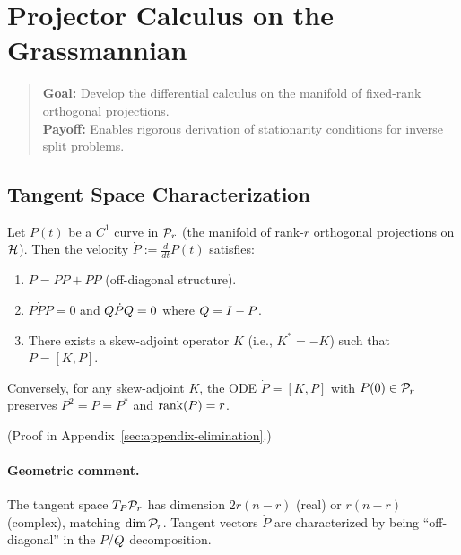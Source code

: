 \section{Projector Calculus on the Grassmannian}
\label{sec:projector-calculus}

\begin{quote}\small
\textbf{Goal:} Develop the differential calculus on the manifold of fixed-rank orthogonal projections.\\
\textbf{Payoff:} Enables rigorous derivation of stationarity conditions for inverse split problems.
\end{quote}

\subsection{Tangent Space Characterization}
\label{subsec:tangent-space}

\begin{lemma}
\label{lem:tangent-characterization}
Let $P(t)$ be a $C^1$ curve in $\mathcal{P}_{r}$ (the manifold of rank-$r$ orthogonal projections on $\mathcal{H}$).
Then the velocity $\dot{P} := \frac{d}{dt} P(t)$ satisfies:
\begin{enumerate}[label=(\roman*)]
\item $\dot{P} = \dot{P} P + P \dot{P}$ (off-diagonal structure).
\item $P \dot{P} P = 0$ and $Q \dot{P} Q = 0$ where $Q = I - P$.
\item There exists a skew-adjoint operator $K$ (i.e., $K^* = -K$) such that $\dot{P} = [K, P]$.
\end{enumerate}
Conversely, for any skew-adjoint $K$, the ODE $\dot{P} = [K, P]$ with $P(0) \in \mathcal{P}_{r}$ preserves $P^2 = P = P^*$ and $\mathrm{rank}(P) = r$.
\end{lemma}

(Proof in Appendix~\ref{sec:appendix-elimination}.)

\paragraph{Geometric comment.}
The tangent space $T_P \mathcal{P}_{r}$ has dimension $2r(n - r)$ (real) or $r(n - r)$ (complex), matching $\dim \mathcal{P}_{r}$.
Tangent vectors $\dot{P}$ are characterized by being ``off-diagonal'' in the $P$/$Q$ decomposition.

